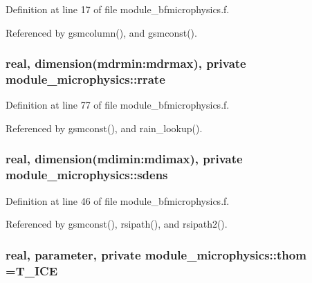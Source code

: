 Definition at line 17 of file module\+\_\+bfmicrophysics.\+f.



Referenced by gsmcolumn(), and gsmconst().

\subsubsection[{\texorpdfstring{rrate}{rrate}}]{\setlength{\rightskip}{0pt plus 5cm}real, dimension(mdrmin\+:mdrmax), private module\+\_\+microphysics\+::rrate\hspace{0.3cm}{\ttfamily [private]}}\hypertarget{namespacemodule__microphysics_a481bd873812c291fe7ddce951cf6440d}{}\label{namespacemodule__microphysics_a481bd873812c291fe7ddce951cf6440d}


Definition at line 77 of file module\+\_\+bfmicrophysics.\+f.



Referenced by gsmconst(), and rain\+\_\+lookup().

\subsubsection[{\texorpdfstring{sdens}{sdens}}]{\setlength{\rightskip}{0pt plus 5cm}real, dimension(mdimin\+:mdimax), private module\+\_\+microphysics\+::sdens\hspace{0.3cm}{\ttfamily [private]}}\hypertarget{namespacemodule__microphysics_ab31a2c459480d3b9ba2388d3f60db179}{}\label{namespacemodule__microphysics_ab31a2c459480d3b9ba2388d3f60db179}


Definition at line 46 of file module\+\_\+bfmicrophysics.\+f.



Referenced by gsmconst(), rsipath(), and rsipath2().

\subsubsection[{\texorpdfstring{thom}{thom}}]{\setlength{\rightskip}{0pt plus 5cm}real, parameter, private module\+\_\+microphysics\+::thom =T\+\_\+\+I\+CE\hspace{0.3cm}{\ttfamily [private]}}\hypertarget{namespacemodule__microphysics_ae6cb25c6ef4d76e53988a1390c99bacb}{}\label{namespacemodule__microphysics_ae6cb25c6ef4d76e53988a1390c99bacb}


